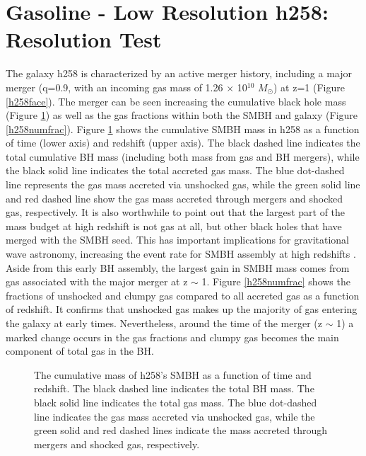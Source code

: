 \documentclass[12pt,headA,chapB]{fiskthesis}
\begin{document}
\section{Gasoline - Low Resolution h258: Resolution Test}
	
The galaxy h258 is characterized by an active merger history, including a major merger (q=0.9, with an incoming gas mass of 1.26 $\times$ 10$^{10}$ $M_{\odot}$) at z=1 (Figure \ref{h258face}). The merger can be seen increasing the cumulative black hole mass (Figure \ref{h258allmassgas}) as well as the gas fractions within both the SMBH and galaxy (Figure \ref{h258numfrac}). Figure \ref{h258allmassgas} shows the cumulative SMBH mass in h258 as a function of time (lower axis) and redshift (upper axis). The black dashed line indicates the total cumulative BH mass (including both mass from gas and BH mergers), while the black solid line indicates the total accreted gas mass. The blue dot-dashed line represents the gas mass accreted via unshocked gas, while the green solid line and red dashed line show the gas mass accreted through mergers and shocked gas, respectively. It is also worthwhile to point out that the largest part of the mass budget at high redshift is not gas at all, but other black holes that have merged with the SMBH seed. This has important implications for gravitational wave astronomy, increasing the event rate for SMBH assembly at high redshifts \citep{Holley-Bockelmann2010}. Aside from this early BH assembly, the largest gain in SMBH mass comes from gas associated with the major merger at z $\sim$ 1. Figure \ref{h258numfrac} shows the fractions of unshocked and clumpy gas compared to all accreted gas as a function of redshift. It confirms that unshocked gas makes up the majority of gas entering the galaxy at early times. Nevertheless, around the time of the merger (z $\sim$ 1) a marked change occurs in the gas fractions and clumpy gas becomes the main component of total gas in the BH.

\begin{figure}
\centerline{}
\caption[GASOLINE h258 SMBH Cumulative Mass]{The cumulative mass of h258's SMBH as a function of time and redshift. The black dashed line indicates the total BH mass. The black solid line indicates the total gas mass. The blue dot-dashed line indicates the gas mass accreted via unshocked gas, while the green solid and red dashed lines indicate the mass accreted through mergers and shocked gas, respectively.}
\label{h258allmassgas} 
\end{figure}
\end{document}
